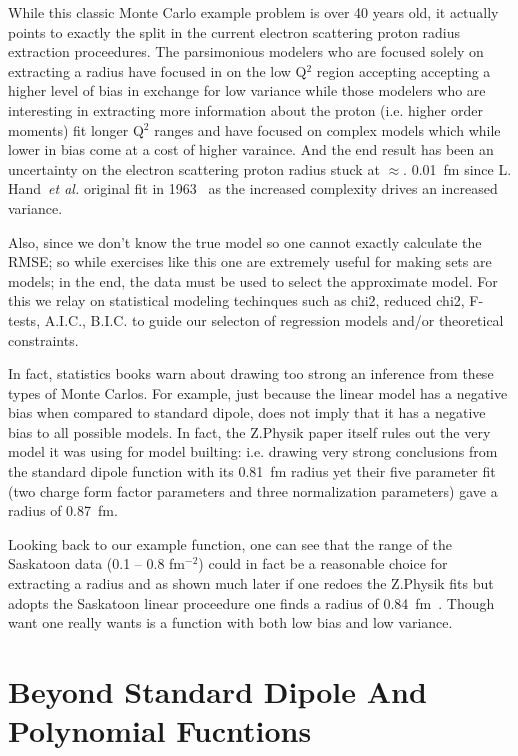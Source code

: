 \documentclass[10pt,aps,prc,twocolumn]{revtex4-1}
\begin{document}
While this classic Monte Carlo example problem is over 40 years old, it actually points to exactly the split in the current electron
scattering proton radius extraction proceedures.     The parsimonious modelers who are focused solely on extracting a radius have
focused in on the low Q$^2$ region accepting accepting a higher level of bias in exchange for low variance while those modelers
who are interesting in extracting more information about the proton (i.e. higher order moments) fit longer Q$^2$ ranges and have
focused on complex models which while lower in bias come at a cost of higher varaince.  
And the end result has been an uncertainty on the electron scattering proton radius stuck at $\approx.$ 0.01~fm since 
L. Hand~{\it{et al.}} original fit in 1963~\cite{} as the increased complexity drives an increased variance.

Also, since we don't know the true model so one cannot exactly calculate the RMSE; so while exercises like this one are
extremely useful for making sets are models; in the end, the data must be used to select the approximate model. 
For this we relay on statistical modeling techinques such as chi2, reduced chi2, F-tests, A.I.C., B.I.C. to guide our selecton of
regression models and/or theoretical constraints.

In fact, statistics books warn about drawing too strong an inference from these types of Monte Carlos.   For example,
just because the linear model has a negative bias when compared to standard dipole, does not imply that it has a negative bias
to all possible models.
In fact, the Z.Physik paper itself rules out the very model it was using for model builting: i.e. drawing very strong conclusions from the standard dipole
function with its 0.81~fm radius yet their five parameter fit (two charge form factor parameters and three normalization parameters)
gave a radius of 0.87~fm.

Looking back to our example function, one can see that the range of the Saskatoon data (0.1 -- 0.8 fm$^{-2}$) could in fact be a reasonable
choice for extracting a radius and as shown much later if one redoes the Z.Physik fits but adopts the Saskatoon linear proceedure one finds
a radius of 0.84~fm~\cite{Higinbotham:2015rja}.   Though want one really wants is a function with both low bias and low variance.

\section{Beyond Standard Dipole And Polynomial Fucntions}
\end{document}

